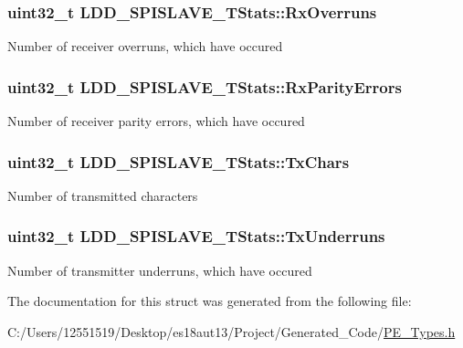 \subsubsection[{Rx\+Overruns}]{\setlength{\rightskip}{0pt plus 5cm}uint32\+\_\+t L\+D\+D\+\_\+\+S\+P\+I\+S\+L\+A\+V\+E\+\_\+\+T\+Stats\+::\+Rx\+Overruns}\label{struct_l_d_d___s_p_i_s_l_a_v_e___t_stats_a82edd5dc5e18e7cd6a047d0efbda97ae}
Number of receiver overruns, which have occured \hypertarget{struct_l_d_d___s_p_i_s_l_a_v_e___t_stats_abef442625b92cf52c2ff04edf6894dd3}{}
\subsubsection[{Rx\+Parity\+Errors}]{\setlength{\rightskip}{0pt plus 5cm}uint32\+\_\+t L\+D\+D\+\_\+\+S\+P\+I\+S\+L\+A\+V\+E\+\_\+\+T\+Stats\+::\+Rx\+Parity\+Errors}\label{struct_l_d_d___s_p_i_s_l_a_v_e___t_stats_abef442625b92cf52c2ff04edf6894dd3}
Number of receiver parity errors, which have occured \hypertarget{struct_l_d_d___s_p_i_s_l_a_v_e___t_stats_ab674ba50318e198a1ee9dea0692ce239}{}
\subsubsection[{Tx\+Chars}]{\setlength{\rightskip}{0pt plus 5cm}uint32\+\_\+t L\+D\+D\+\_\+\+S\+P\+I\+S\+L\+A\+V\+E\+\_\+\+T\+Stats\+::\+Tx\+Chars}\label{struct_l_d_d___s_p_i_s_l_a_v_e___t_stats_ab674ba50318e198a1ee9dea0692ce239}
Number of transmitted characters \hypertarget{struct_l_d_d___s_p_i_s_l_a_v_e___t_stats_ab2e5342f4a486b20ae9306f451451a77}{}
\subsubsection[{Tx\+Underruns}]{\setlength{\rightskip}{0pt plus 5cm}uint32\+\_\+t L\+D\+D\+\_\+\+S\+P\+I\+S\+L\+A\+V\+E\+\_\+\+T\+Stats\+::\+Tx\+Underruns}\label{struct_l_d_d___s_p_i_s_l_a_v_e___t_stats_ab2e5342f4a486b20ae9306f451451a77}
Number of transmitter underruns, which have occured 

The documentation for this struct was generated from the following file\+:\begin{DoxyCompactItemize}
\item 
C\+:/\+Users/12551519/\+Desktop/es18aut13/\+Project/\+Generated\+\_\+\+Code/\hyperlink{_p_e___types_8h}{P\+E\+\_\+\+Types.\+h}\end{DoxyCompactItemize}
